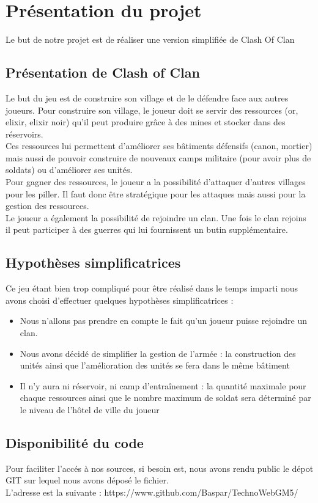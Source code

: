 \chapter{Présentation du projet}
	Le but de notre projet est de réaliser une version simplifiée de Clash Of Clan

    \section{Présentation de Clash of Clan}
		Le but du jeu est de construire son village et de le défendre face aux autres joueurs. Pour construire son village, le joueur doit se servir des ressources (or, elixir, elixir noir) qu'il peut produire grâce à des mines et stocker dans des réservoirs. \\
		Ces ressources lui permettent d'améliorer ses bâtiments défensifs (canon, mortier) mais aussi de pouvoir construire de nouveaux camps militaire (pour avoir plus de soldats) ou d'améliorer ses unités. \\
		Pour gagner des ressources, le joueur a la possibilité d'attaquer d'autres villages pour les piller. Il faut donc être stratégique pour les attaques mais aussi pour la gestion des ressources. \\
		Le joueur a également la possibilité de rejoindre un clan. Une fois le clan rejoins il peut participer à des guerres qui lui fournissent un butin supplémentaire.      
        
    \section{Hypothèses simplificatrices}
		Ce jeu étant bien trop compliqué pour être réalisé dans le temps imparti nous avons choisi d'effectuer quelques hypothèses simplificatrices : 
\begin{itemize}
\item Nous n'allons pas prendre en compte le fait qu'un joueur puisse rejoindre un clan. 
\item Nous avons décidé de simplifier la gestion de l'armée : la construction des unités ainsi que l'amélioration des unités se fera dans le même bâtiment
\item Il n'y aura ni réservoir, ni camp d’entraînement : la quantité maximale pour chaque ressources ainsi que le nombre maximum de soldat sera déterminé par le niveau de l'hôtel de ville du joueur
\end{itemize}
    \section{Disponibilité du code}
	Pour faciliter l'accés à nos sources, si besoin est, nous avons rendu public le dépot GIT sur lequel nous avons déposé le fichier.\\
	L'adresse est la suivante : https://www.github.com/Baspar/TechnoWebGM5/
